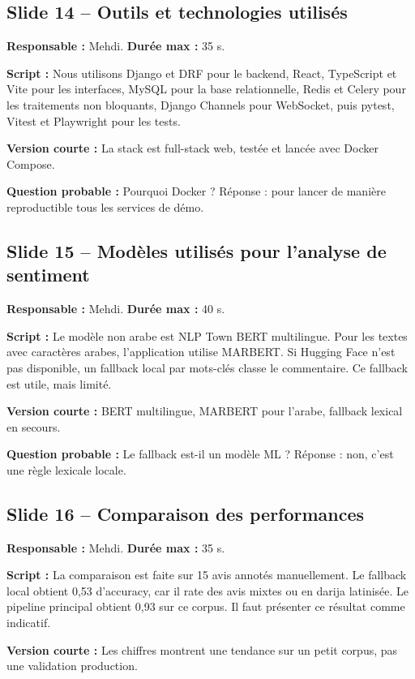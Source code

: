\documentclass[11pt,a4paper]{article}
\begin{document}
\subsection*{Slide 14 -- Outils et technologies utilisés}
\textbf{Responsable :} Mehdi. \textbf{Durée max :} 35 s.

\textbf{Script :} Nous utilisons Django et DRF pour le backend, React, TypeScript et Vite pour les interfaces, MySQL pour la base relationnelle, Redis et Celery pour les traitements non bloquants, Django Channels pour WebSocket, puis pytest, Vitest et Playwright pour les tests.

\textbf{Version courte :} La stack est full-stack web, testée et lancée avec Docker Compose.

\textbf{Question probable :} Pourquoi Docker ? Réponse : pour lancer de manière reproductible tous les services de démo.

\subsection*{Slide 15 -- Modèles utilisés pour l'analyse de sentiment}
\textbf{Responsable :} Mehdi. \textbf{Durée max :} 40 s.

\textbf{Script :} Le modèle non arabe est NLP Town BERT multilingue. Pour les textes avec caractères arabes, l'application utilise MARBERT. Si Hugging Face n'est pas disponible, un fallback local par mots-clés classe le commentaire. Ce fallback est utile, mais limité.

\textbf{Version courte :} BERT multilingue, MARBERT pour l'arabe, fallback lexical en secours.

\textbf{Question probable :} Le fallback est-il un modèle ML ? Réponse : non, c'est une règle lexicale locale.

\subsection*{Slide 16 -- Comparaison des performances}
\textbf{Responsable :} Mehdi. \textbf{Durée max :} 35 s.

\textbf{Script :} La comparaison est faite sur 15 avis annotés manuellement. Le fallback local obtient 0,53 d'accuracy, car il rate des avis mixtes ou en darija latinisée. Le pipeline principal obtient 0,93 sur ce corpus. Il faut présenter ce résultat comme indicatif.

\textbf{Version courte :} Les chiffres montrent une tendance sur un petit corpus, pas une validation production.
\end{document}
